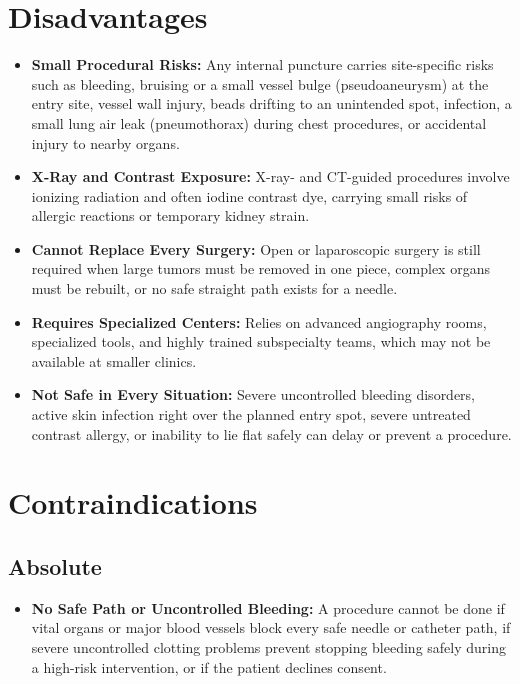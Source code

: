 \section{Disadvantages}

\begin{itemize}
    \item \textbf{Small Procedural Risks:} Any internal puncture carries site-specific risks such as bleeding, bruising or a small vessel bulge (pseudoaneurysm) at the entry site, vessel wall injury, beads drifting to an unintended spot, infection, a small lung air leak (pneumothorax) during chest procedures, or accidental injury to nearby organs.
    \item \textbf{X-Ray and Contrast Exposure:} X-ray- and CT-guided procedures involve ionizing radiation and often iodine contrast dye, carrying small risks of allergic reactions or temporary kidney strain.
    \item \textbf{Cannot Replace Every Surgery:} Open or laparoscopic surgery is still required when large tumors must be removed in one piece, complex organs must be rebuilt, or no safe straight path exists for a needle.
    \item \textbf{Requires Specialized Centers:} Relies on advanced angiography rooms, specialized tools, and highly trained subspecialty teams, which may not be available at smaller clinics.
    \item \textbf{Not Safe in Every Situation:} Severe uncontrolled bleeding disorders, active skin infection right over the planned entry spot, severe untreated contrast allergy, or inability to lie flat safely can delay or prevent a procedure.
\end{itemize}

\section{Contraindications}

\subsection{Absolute}

\begin{itemize}
    \item \textbf{No Safe Path or Uncontrolled Bleeding:} A procedure cannot be done if vital organs or major blood vessels block every safe needle or catheter path, if severe uncontrolled clotting problems prevent stopping bleeding safely during a high-risk intervention, or if the patient declines consent.
\end{itemize}

